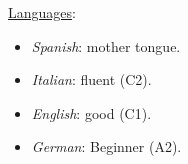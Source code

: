 \addskill%
{%
    \underline{Languages}:%
    \begin{multicols}{2}
        \begin{itemize}[nosep, rightmargin=0cm]%
            \item {\em Spanish}: mother tongue.
            \item {\em Italian}: fluent (C2).
            \columnbreak
            \item {\em English}: good (C1).
            \item {\em German}: Beginner (A2).
        \end{itemize}%
    \end{multicols}
}%

%

